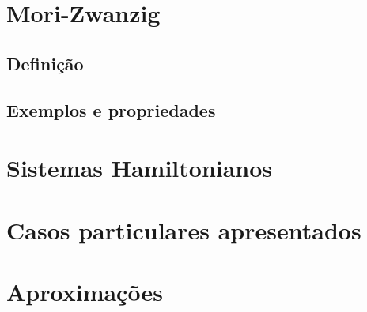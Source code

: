 \documentclass[12pt]{article}
\begin{document}


\section{Mori-Zwanzig}
\subsection{Definição}
\subsection{Exemplos e propriedades}

\appendix
\section{Sistemas Hamiltonianos}

\section{Casos particulares apresentados}

\section{Aproximações}
\newpage
\nocite{*}
\printbibliography
\end{document}
